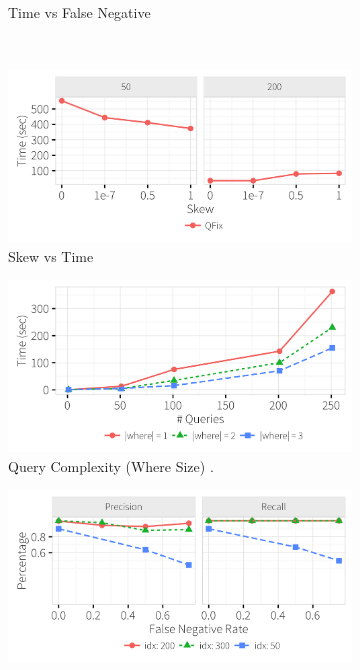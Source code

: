 \begin{figure}[h]
\begin{subfigure}[t]{.3\textwidth}
    \vspace*{-.2in}
    \caption{Time vs False Negative}
    \label{f:falsenegative_time} 
    \end{subfigure} 
    \\
    \begin{subfigure}[t]{.3\textwidth}
    \includegraphics[width = .99\columnwidth]{figures/skew_time}
    \vspace*{-.2in}
    \caption{Skew vs Time}
    \label{f:skew_time} 
    \end{subfigure}
	\begin{subfigure}[t]{.3\textwidth}
      \includegraphics[width = .99\columnwidth]{figures/where_time}
      \vspace*{-.2in}
      \caption{Query Complexity (Where Size) .}
      \label{f:where_time} 
    \end{subfigure}
    \begin{subfigure}[t]{.3\textwidth}
    \includegraphics[width = .99\columnwidth]{figures/noise_fn_acc}

\end{subfigure}
\end{figure}
